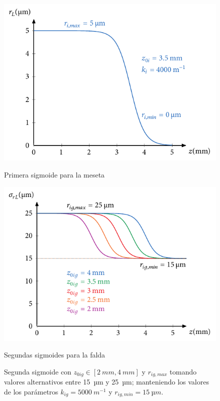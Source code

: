 \begin{figure}[htbp]
  \centering
  \begin{subcaptionblock}{.4\textwidth}
    \centering
    \includegraphics[width=\textwidth]{Figuras/ch4_ejsigm3.pdf}
    \caption{Primera sigmoide para la meseta}\label{fig:ch4_sigm1_rg}
  \end{subcaptionblock}
  \begin{subcaptionblock}{.4\textwidth}
    \centering
    \includegraphics[width=\textwidth]{Figuras/ch4_sigm_z0g.pdf}
    \caption{Segundas sigmoides para la falda}\label{fig:ch4_sigm2_rg}
  \end{subcaptionblock}
  \caption{Segunda sigmoide con $z_{0ig}\in[\qty{2}{mm},\qty{4}{mm}]$ y $r_{ig,max}$ tomando valores alternativos entre \qty{15}{µm} y \qty{25}{µm}; manteniendo los valores de los parámetros $k_{ig}=\qty{5000}{m^{-1}}$ y $r_{ig,min}=\qty{15}{µm}$.}
   \label{fig:4.23}
\end{figure}

